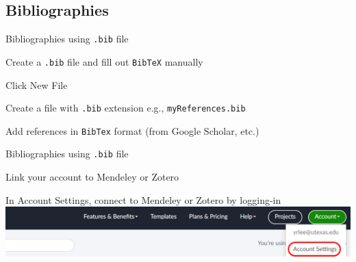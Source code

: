 \documentclass[13pt]{beamer}
\newcommand{\itemA}{\item[\textcolor{black}{\textbullet}]}
\newcommand{\itemB}{\item[\textcolor{black}{\textopenbullet}]}
\newcommand{\green}{\textcolor{colorgreen}}
\begin{document}
\subsection{Bibliographies}
\begin{frame}{Bibliographies using \texttt{.bib} file}

 \begin{fullpageitemize}
    \itemA Create a \texttt{.bib} file and fill out \texttt{BibTeX} manually \hfill \break
    
    \begin{fullpageitemize}
    \itemB Click \green{New File}
    \itemB Create a file with \texttt{.bib} extension {\footnotesize e.g., \texttt{myReferences.bib}}
    \itemB Add references in \texttt{BibTex} format {\footnotesize(from Google Scholar, etc.)}
    \end{fullpageitemize}

\end{fullpageitemize}
\end{frame}

\begin{frame}{Bibliographies using \texttt{.bib} file}

 \begin{fullpageitemize}
        
    \itemA Link your account to Mendeley or Zotero \hfill \break
        \begin{fullpageitemize}
        \item [\textcolor{black}{\textopenbullet}]In \green{Account Settings}, connect to Mendeley or Zotero by logging-in \\ \hfill \break
        \includegraphics[width=\textwidth,keepaspectratio]{images/ut_overleaf4.png}
        \end{fullpageitemize}
\end{fullpageitemize}

\end{frame}
\end{document}
